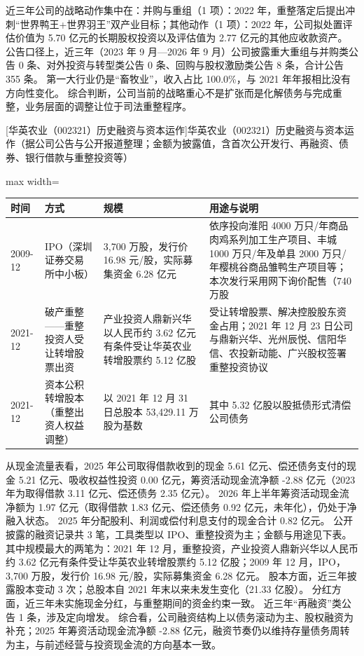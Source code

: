  近三年公司的战略动作集中在：并购与重组（1 项）：2022 年，重整落定后提出冲刺“世界鸭王+世界羽王”双产业目标；其他动作（1 项）：2022 年，公司拟处置评估价值为 5.70 亿元的长期股权投资以及评估值为 2.77 亿元的其他应收款资产。 公告口径上，近三年（2023 年 9 月---2026 年 9 月）公司披露重大重组与并购类公告 0 条、对外投资与转型类公告 0 条、回购与股权激励类公告 8 条，合计公告 355 条。 第一大行业仍是“畜牧业”，收入占比 100.0\%，与 2021 年年报相比没有方向性变化。 综合判断，公司当前的战略重心不是扩张而是化解债务与完成重整，业务层面的调整让位于司法重整程序。

\begin{center}\small\setlength{\tabcolsep}{4pt}
[华英农业（002321）历史融资与资本运作]{华英农业（002321）历史融资与资本运作（据公司公告与公开报道整理；金额为披露值，含首次公开发行、再融资、债券、银行借款与重整投资等）}
\begin{adjustbox}{max width=\textwidth}
\begin{tabular}{@{}p{1.45cm}p{2.55cm}p{4.05cm}p{4.95cm}@{}}
\toprule
时间 & 方式 & 规模 & 用途与说明 \\
\midrule
2009-12 & IPO（深圳证券交易所中小板） & 3,\allowbreak{}700 万股，\allowbreak{}发行价 16.98 元/\allowbreak{}股，\allowbreak{}实际募集资金 6.28 亿元 & 依序投向淮阳 4000 万只/\allowbreak{}年商品肉鸡系列加工生产项目、\allowbreak{}丰城 1000 万只/\allowbreak{}年及单县 2000 万只/\allowbreak{}年樱桃谷商品雏鸭生产项目等；本次发行采用网下询价配售（740 万股 \\
2021-12 & 破产重整——重整投资人受让转增股票出资 & 产业投资人鼎新兴华以人民币约 3.62 亿元有条件受让华英农业转增股票约 5.12 亿股 & 受让转增股票、\allowbreak{}解决控股股东资金占用；2021 年 12 月 23 日公司与鼎新兴华、\allowbreak{}光州辰悦、\allowbreak{}信阳华信、\allowbreak{}农投新动能、\allowbreak{}广兴股权签署重整投资协议 \\
2021-12 & 资本公积转增股本（重整出资人权益调整） & 以 2021 年 12 月 31 日总股本 53,\allowbreak{}429.11 万股为基数 & 其中 5.32 亿股以股抵债形式清偿公司债务 \\
\bottomrule
\end{tabular}
\end{adjustbox}
\end{center}

 从现金流量表看，2025 年公司取得借款收到的现金 5.61 亿元、偿还债务支付的现金 5.21 亿元、吸收权益性投资 0.00 亿元，筹资活动现金流净额 -2.88 亿元（2023 年为取得借款 3.11 亿元、偿还债务 2.35 亿元）。 2026 年上半年筹资活动现金流净额为 1.97 亿元（取得借款 1.83 亿元、偿还债务 0.92 亿元，未年化），仍处于净融入状态。 2025 年分配股利、利润或偿付利息支付的现金合计 0.82 亿元。 公开披露的融资记录共 3 笔，工具类型以 IPO、重整投资为主；金额与用途见下表。 其中规模最大的两笔为：2021 年 12 月，重整投资，产业投资人鼎新兴华以人民币约 3.62 亿元有条件受让华英农业转增股票约 5.12 亿股；2009 年 12 月，IPO，3,700 万股，发行价 16.98 元/股，实际募集资金 6.28 亿元。 股本方面，近三年披露股本变动 3 次；总股本自 2021 年末以来未发生变化（21.33 亿股）。 分红方面，近三年未实施现金分红，与重整期间的资金约束一致。 近三年“再融资”类公告 1 条，涉及定向增发。 综合看，公司融资结构上以债务滚动为主、股权融资为补充；2025 年筹资活动现金流净额 -2.88 亿元，融资节奏仍以维持存量债务周转为主，与前述经营与投资现金流的方向基本一致。

